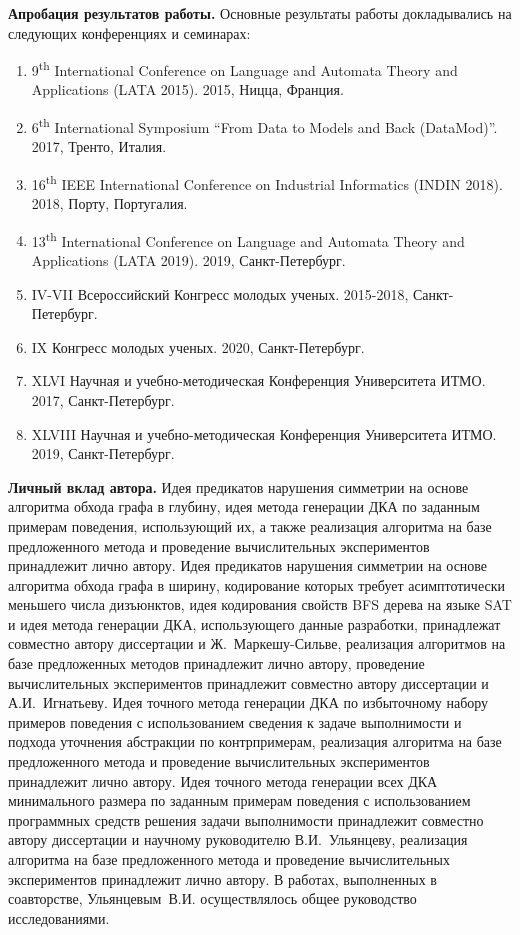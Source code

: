 \textbf{Апробация результатов работы.}
Основные результаты работы докладывались на следующих конференциях и семинарах:
\begin{enumerate}
  \item 9\textsuperscript{th} International Conference on Language and Automata Theory and Applications (LATA 2015). 2015, Ницца, Франция.
  \item 6\textsuperscript{th} International Symposium ``From Data to Models and Back (DataMod)''. 2017, Тренто, Италия.
  \item 16\textsuperscript{th} IEEE International Conference on Industrial Informatics (INDIN 2018). 2018, Порту, Португалия.
  \item 13\textsuperscript{th} International Conference on Language and Automata Theory and Applications (LATA 2019). 2019, Санкт-Петербург.
  \item IV-VII Всероссийский Конгресс молодых ученых. 2015-2018, Санкт-Петербург.
  \item IX Конгресс молодых ученых. 2020, Санкт-Петербург.
  \item XLVI Научная и учебно-методическая Конференция Университета \mbox{ИТМО}. 2017, Санкт-Петербург.
  \item XLVIII Научная и учебно-методическая Конференция Университета ИТМО. 2019, Санкт-Петербург.
\end{enumerate}

\textbf{Личный вклад автора.}
Идея предикатов нарушения симметрии на основе алгоритма обхода графа в глубину, идея метода генерации ДКА по заданным примерам поведения, использующий их, а также реализация алгоритма на базе предложенного метода и проведение вычислительных экспериментов принадлежит лично автору.
Идея предикатов нарушения симметрии на основе алгоритма обхода графа в ширину, кодирование которых требует асимптотически меньшего числа дизъюнктов, идея кодирования свойств BFS дерева на языке SAT и идея метода генерации ДКА, использующего данные разработки, принадлежат совместно автору диссертации и Ж.~Маркешу-Сильве, реализация алгоритмов на базе предложенных методов принадлежит лично автору, проведение вычислительных экспериментов принадлежит совместно автору диссертации и А.И.~Игнатьеву.
Идея точного метода генерации ДКА по избыточному набору примеров поведения с использованием сведения к задаче выполнимости и подхода уточнения абстракции по контрпримерам, реализация алгоритма на базе предложенного метода и проведение вычислительных экспериментов принадлежит лично автору.
Идея точного метода генерации всех ДКА минимального размера по заданным примерам поведения с использованием программных средств решения задачи выполнимости принадлежит совместно автору диссертации и научному руководителю В.И.~Ульянцеву, реализация алгоритма на базе предложенного метода и проведение вычислительных экспериментов принадлежит лично автору.
В работах, выполненных в соавторстве, Ульянцевым~В.И. осуществлялось общее руководство исследованиями.

